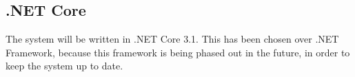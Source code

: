 \subsection{.NET Core} \label{ssc:tech_core}
The system will be written in .NET Core 3.1. This has been chosen over .NET Framework, because this framework is being phased out in the future, in order to keep the system up to date. %